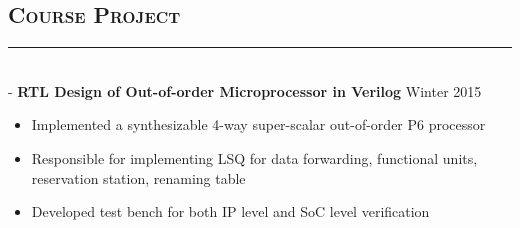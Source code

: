 \documentclass[12pt]{res}
\newcommand{\style}[1]{\color{Blue}\large\textsc{#1}}
\begin{document}
\begin{resume}
   
   
   \vspace{-25pt}
\section{\style{Course Project}}
\vspace{-10pt}
\rule{18cm}{0.5mm}\\
 -\sectionwidth \resumewidth
 \textbf{RTL Design of Out-of-order Microprocessor in Verilog}  \hfill{Winter 2015} \hspace{-0.58in}\vspace{-0mm}\\
  \vspace{-14pt}
 \begin{itemize}[leftmargin=-0.1in]
  \item Implemented a synthesizable 4-way super-scalar out-of-order P6  processor \vspace{-4pt}
  \item Responsible for implementing LSQ for data forwarding, functional units,  reservation station, renaming table\vspace{-4pt}
  \item Developed test bench for both IP level and SoC level verification\vspace{-3pt}

\end{itemize}\vspace{-10pt}
   


\end{resume}
\end{document}
